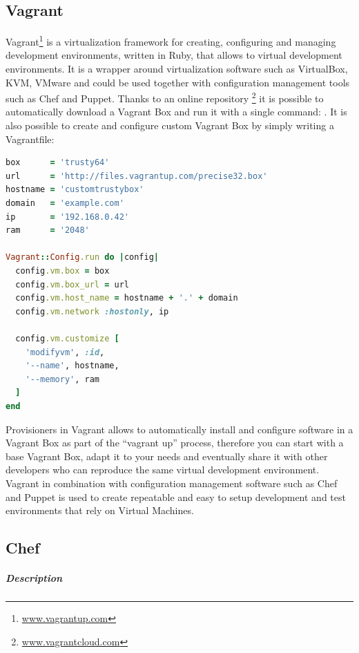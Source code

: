 \subsection{Vagrant}
\label{sub:sota_vagrant}
Vagrant\footnote{\url{www.vagrantup.com}} is a virtualization framework for creating, configuring and managing development environments, written in Ruby, that allows to  virtual development environments. It is a wrapper around virtualization software such as VirtualBox, KVM, VMware and could be used together with configuration management tools such as Chef and Puppet.
Thanks to an online repository \footnote{\url{www.vagrantcloud.com}} it is possible to automatically download a Vagrant Box and run it with a single command: .
It is also possible to create and configure custom Vagrant Box by simply writing a Vagrantfile:
\begin{lstlisting}[language=Ruby]
box      = 'trusty64'
url      = 'http://files.vagrantup.com/precise32.box'
hostname = 'customtrustybox'
domain   = 'example.com'
ip       = '192.168.0.42'
ram      = '2048'

Vagrant::Config.run do |config|
  config.vm.box = box
  config.vm.box_url = url
  config.vm.host_name = hostname + '.' + domain
  config.vm.network :hostonly, ip

  config.vm.customize [
    'modifyvm', :id,
    '--name', hostname,
    '--memory', ram
  ]
end
\end{lstlisting}
Provisioners in Vagrant allows to automatically install and configure software in a Vagrant Box as part of the ``vagrant up'' process, therefore you can start with a base Vagrant Box, adapt it to your needs and eventually share it with other developers who can reproduce the same virtual development environment.
Vagrant in combination with configuration management software such as Chef and Puppet is used to create repeatable and easy to setup development and test environments that rely on Virtual Machines.



\subsection{Chef}
\label{sub:sota_chef}

\subparagraph{Description}
\label{subp:sota_chef_desc}

